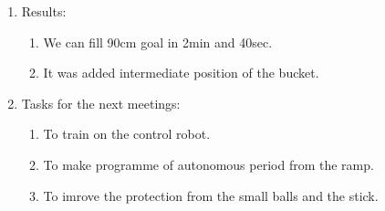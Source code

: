 \begin{enumerate}
\begin{enumerate}
	\end{enumerate}
	
	\item Results:
	\begin{enumerate}
		
		\item We can fill 90cm goal in 2min and 40sec.
		
		\item It was added intermediate position of the bucket.
		
	\end{enumerate}
	
	\item Tasks for the next meetings:
	\begin{enumerate}
		
		\item To train on the control robot.
		
		\item To make programme of autonomous period from the ramp.
		
		\item To imrove the protection from the small balls and the stick.
			
	\end{enumerate}
\end{enumerate}
\fillpage
